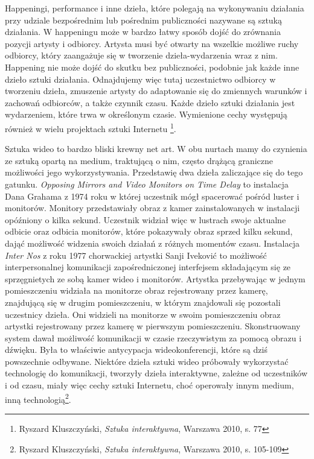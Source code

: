 \documentclass[a4paper,12pt,twoside]{article}
\begin{document}
Happeningi, performance i inne dzieła, które polegają na wykonywaniu
działania przy udziale bezpośrednim lub pośrednim publiczności
nazywane są sztuką działania. W happeningu może w bardzo łatwy sposób
dojść do zrównania pozycji artysty i odbiorcy. Artysta musi być otwarty
na wszelkie możliwe ruchy odbiorcy, który zaangażuje się w tworzenie
dzieła-wydarzenia wraz z nim. Happening nie może dojść do skutku
bez publiczności, podobnie jak każde inne dzieło sztuki działania.
Odnajdujemy więc tutaj uczestnictwo odbiorcy w tworzeniu dzieła,
zmuszenie artysty do adaptowanie się do zmiennych warunków i zachowań
odbiorców, a także czynnik czasu. Każde dzieło sztuki działania
jest wydarzeniem, które trwa w określonym czasie. Wymienione cechy
występują również w wielu projektach sztuki Internetu
\footnote{ Ryszard Kluszczyński, \textit{Sztuka interaktywna},
Warszawa 2010, s. 77}.

Sztuka wideo to bardzo bliski krewny net art. W obu nurtach mamy do czynienia
ze sztuką opartą na medium, traktującą o nim, często drążącą graniczne
możliwości jego wykorzystywania. Przedstawię dwa dzieła zaliczające się
do tego gatunku. \textit{Opposing Mirrors and Video Monitors on Time Delay}
to instalacja Dana Grahama z 1974 roku w której uczestnik mógł spacerować
pośród luster i monitorów. Monitory przedstawiały obraz z kamer zainstalowanych
w instalacji opóźniony o kilka sekund. Uczestnik widział więc w lustrach
swoje aktualne odbicie oraz odbicia monitorów, które pokazywały obraz sprzed
kilku sekund, dająć możliwość widzenia swoich działań z różnych momentów czasu.
Instalacja \textit{Inter Nos} z roku 1977 chorwackiej artystki Sanji Iveković
to możliwość interpersonalnej komunikacji zapośredniczonej interfejsem
składającym się ze sprzęgnietych ze sobą kamer wideo i monitorów. Artystka
przebywając w jednym pomieszczeniu widziała na monitorze obraz rejestrowany
przez kamerę, znajdującą się w drugim pomieszczeniu, w którym znajdowali
się pozostali uczestnicy dzieła. Oni widzieli na monitorze w swoim
pomieszczeniu obraz artystki rejestrowany przez kamerę w pierwszym
pomieszczeniu. Skonstruowany system dawał możliwość komunikacji
w czasie rzeczywistym za pomocą obrazu i dźwięku. Była to właściwie
antycypacja wideokonferencji, które są dziś powszechnie odbywane.
Niektóre dzieła sztuki wideo próbowały wykorzystać technologię do
komunikacji, tworzyły dzieła interaktywne, zależne od uczestników
i od czasu, miały więc cechy sztuki Internetu, choć operowały innym medium,
inną technologią\footnote{ Ryszard Kluszczyński, \textit{Sztuka interaktywna},
Warszawa 2010, s. 105-109}.
\end{document}
